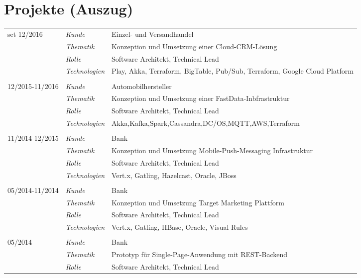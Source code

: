 \section*{Projekte (Auszug)}
\renewcommand{\arraystretch}{1.3}
\begin{longtable}{@{}>{}p{4cm}>{\itshape}p{2cm}>{}p{9cm}}
set 12/2016         & Kunde 	    & Einzel- und Versandhandel\\
\nopagebreak		& Thematik	    & Konzeption und Umsetzung einer Cloud-CRM-Lösung\\
\nopagebreak		& Rolle 	    & Software Architekt, Technical Lead\\
\nopagebreak		& Technologien	& Play, Akka, Terraform, BigTable, Pub/Sub, Terraform, Google Cloud Platform\\
\\
12/2015-11/2016     & Kunde 	    & Automobilhersteller\\
\nopagebreak		& Thematik	    & Konzeption und Umsetzung einer FastData-Inbfrastruktur\\
\nopagebreak		& Rolle 	    & Software Architekt, Technical Lead\\
\nopagebreak		& Technologien	& Akka,Kafka,Spark,Cassandra,DC/OS,MQTT,AWS,Terraform\\
\\
11/2014-12/2015     & Kunde 	    & Bank\\
\nopagebreak		& Thematik	    & Konzeption und Umsetzung Mobile-Push-Messaging Infrastruktur\\
\nopagebreak		& Rolle 	    & Software Architekt, Technical Lead\\
\nopagebreak		& Technologien	& Vert.x, Gatling, Hazelcast, Oracle, JBoss\\
\\
05/2014-11/2014     & Kunde 	    & Bank\\
\nopagebreak		& Thematik	    & Konzeption und Umsetzung Target Marketing Plattform \\
\nopagebreak		& Rolle 	    & Software Architekt, Technical Lead\\
\nopagebreak		& Technologien	& Vert.x, Gatling, HBase, Oracle, Visual Rules\\
\\
05/2014             & Kunde 	        & Bank\\
\nopagebreak		& Thematik	    & Prototyp für Single-Page-Anwendung mit REST-Backend\\
\nopagebreak		& Rolle 	    & Software Architekt, Technical Lead\\

\end{longtable}
